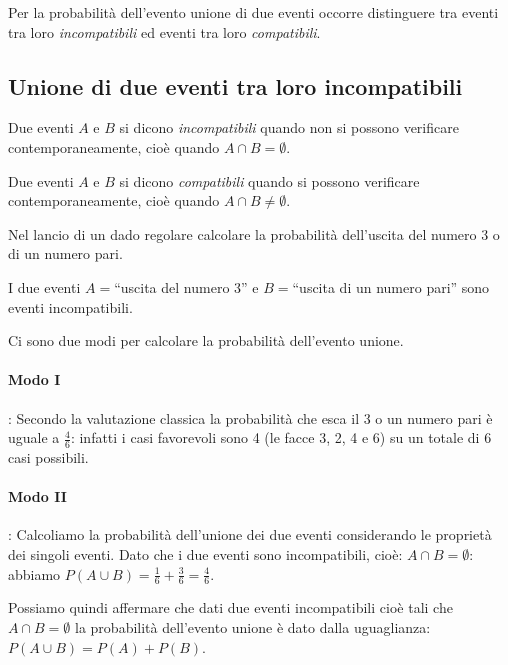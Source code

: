 Per la probabilità dell'evento unione di due eventi occorre distinguere tra eventi tra loro \emph{incompatibili} ed eventi tra loro \emph{compatibili}.

\subsection[Unione di due eventi tra loro incompatibili]{Unione di due eventi tra loro incompatibili}

\begin{definizione}
Due eventi $A$ e $B$ si dicono \emph{incompatibili} quando non si possono verificare contemporaneamente, cioè quando $A\cap B=\emptyset$.
\end{definizione}

\begin{definizione}
Due eventi $A$ e $B$ si dicono \emph{compatibili} quando si possono verificare contemporaneamente, cioè quando $A\cap B\neq \emptyset$.
\end{definizione}
\pagebreak
\begin{exrig}
\begin{esempio}
Nel lancio di un dado regolare calcolare la probabilità dell'uscita del numero 3 o di un numero pari.

I due eventi $A=$``uscita del numero 3'' e $B=$``uscita di un numero pari'' sono eventi incompatibili.

Ci sono due modi per calcolare la probabilità dell'evento unione.
\paragraph{Modo I}: Secondo la valutazione classica la probabilità che esca il $3$ o un numero pari è uguale a $\frac 4 6$: infatti i casi favorevoli sono 4 (le facce 3, 2, 4 e 6) su un totale di $6$ casi possibili.
\paragraph{Modo II}: Calcoliamo la probabilità dell'unione dei due eventi considerando le proprietà dei singoli eventi. Dato che i due eventi sono incompatibili, cioè: $A\cap B=\emptyset $: abbiamo $P(A\cup B)=\frac 1 6+\frac 3 6=\frac 4 6$.
\begin{center}
 
\end{center}
\end{esempio}
\end{exrig}

Possiamo quindi affermare che dati due eventi incompatibili cioè tali che $A\cap B=\emptyset$ la probabilità dell'evento unione è dato dalla uguaglianza: $P(A\cup B)=P(A)+P(B)$.

